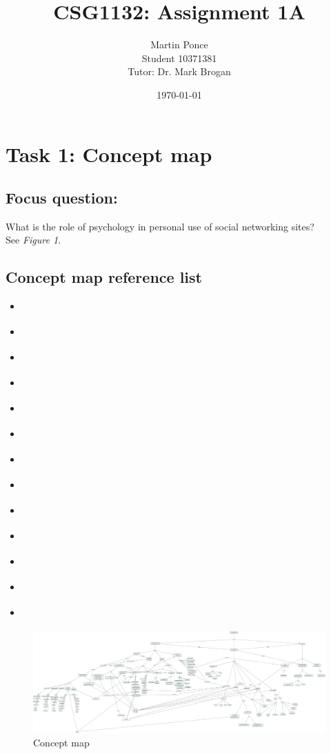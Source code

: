 \documentclass[12pt,a4paper]{report}
\title{CSG1132: Assignment 1A}
\author{Martin Ponce\\Student 10371381\\Tutor: Dr. Mark Brogan}
\date{\today}
\begin{document}
\maketitle

\section*{\textsf{Task 1: Concept map}}
\subsection*{\textsf{Focus question:}}
What is the role of psychology in personal use of social networking sites?\\

See \emph{Figure 1.}

\subsection*{\textsf{Concept map reference list}}
\begin{itemize}
\item \citet*{Pai2013}
\item \citet*{McAndrew2012}
\item \citet*{Nadkarni2012}
\item \citet*{Moore2012}
\item \citet*{Ross2009}
\item \citet*{Toma2013}
\item \citet*{Ellison2007}
\item \citet*{Park2011}
\item \citet*{Anderson2012}
\item \citet*{Ku2013}
\item \citet*{Rosen2013}
\item \citet*{Trottier2012}
\item \citet*{Kwan2013}

\end{itemize}

\newpage
\thispagestyle{empty}
\begin{landscape}
\begin{figure}[H]
	\centering
	\caption{Concept map}
	\includegraphics[scale=0.13]{./img/test.png}
\end{figure}
\end{landscape}
\end{document}
